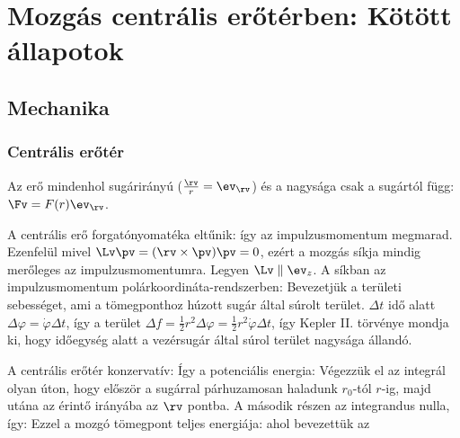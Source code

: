 \chapter{Mozg\'as centr\'alis er\H{o}t\'erben: K\"ot\"ott \'allapotok}
 
 \section{Mechanika} 
  
  \subsection{Centrális erőtér}
   
   Az erő mindenhol sugárirányú ($\frac{\rv}{r}=\ev_\rv$) és a nagysága csak a sugártól függ: $\Fv=F(r)\ev_\rv$. 
   
   A centrális erő forgatónyomatéka eltűnik:
   így az impulzusmomentum megmarad.
   Ezenfelül mivel $\Lv\pv=(\rv\times\pv)\pv=0$, ezért a mozgás síkja mindig merőleges az impulzusmomentumra.
   Legyen $\Lv\parallel \ev_z$.
   A síkban az impulzusmomentum polárkoordináta-rendszerben:
   Bevezetjük a területi sebességet, ami a tömegponthoz húzott sugár által súrolt terület. $\Delta t$ idő alatt $\Delta\varphi=\dot\varphi \Delta t$, így a terület $\Delta f=\frac{1}{2}r^2\Delta\varphi=\frac{1}{2}r^2\dot\varphi \Delta t$, így
   Kepler II. törvénye mondja ki, hogy időegység alatt a vezérsugár által súrol terület nagysága állandó. 
   
   A centrális erőtér konzervatív:
   Így a potenciális energia:
   Végezzük el az integrál olyan úton, hogy először a sugárral párhuzamosan haladunk $r_0$-tól $r$-ig, majd utána az érintő irányába az $\rv$ pontba.
   A második részen az integrandus nulla, így:
   Ezzel a mozgó tömegpont teljes energiája:
   ahol bevezettük az 
   
